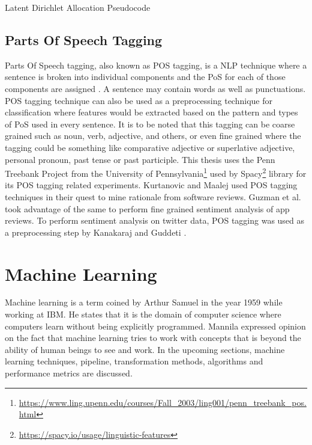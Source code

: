 \documentclass[a4paper,12pt,twoside]{report}
\begin{document}
\begin{algorithm}
\caption{Latent Dirichlet Allocation Pseudocode}
\begin{algorithmic}[1]
	\State {}
    	\State {}
    \EndFor
\EndFor
\State {}
\EndProcedure
\end{algorithmic}
\end{algorithm}

\subsection{Parts Of Speech Tagging}
Parts Of Speech tagging, also known as \acs{POS} tagging, is a \acs{NLP} technique where a sentence is broken into individual components and the PoS for each of those components are assigned \cite{Jurafsky2017}. A sentence may contain words as well as punctuations. \acs{POS} tagging technique can also be used as a preprocessing technique for classification where features would be extracted based on the pattern and types of PoS used in every sentence. It is to be noted that this tagging can be coarse grained such as noun, verb, adjective, and others, or even fine grained where the tagging could be something like comparative adjective or superlative adjective, personal pronoun, past tense or past participle. This thesis uses the Penn Treebank Project from the University of Pennsylvania\footnote{\url{https://www.ling.upenn.edu/courses/Fall_2003/ling001/penn_treebank_pos.html}} used by Spacy\footnote{\url{https://spacy.io/usage/linguistic-features}} library for its \acs{POS} tagging related experiments.
\newline \newline
Kurtanovic and Maalej \cite{Kurtanovic2017} used \acs{POS} tagging techniques in their quest to mine rationale from software reviews. Guzman et al.\cite{Guzman2015} took advantage of the same to perform fine grained sentiment analysis of app reviews. To perform sentiment analysis on twitter data, \acs{POS} tagging was used as a preprocessing step by Kanakaraj and Guddeti \cite{Kanakaraj2015}.


\section{Machine Learning}
Machine learning is a term coined by Arthur Samuel in the year 1959 \cite{Samuel1959a} while working at IBM. He states that it is the domain of computer science where computers learn without being explicitly programmed. Mannila \cite{Mannila1996a} expressed opinion on the fact that machine learning tries to work with concepts that is beyond the ability of human beings to see and work. In the upcoming sections, machine learning techniques, pipeline, transformation methods, algorithms and performance metrics are discussed. 
\end{document}
